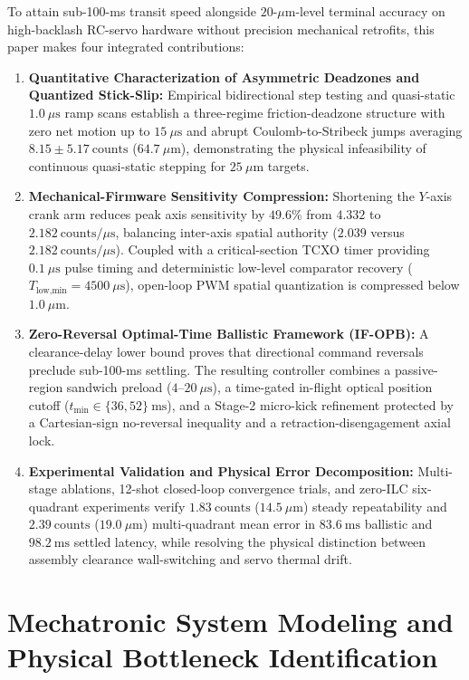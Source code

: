 \documentclass[journal]{IEEEtran}
\begin{document}
To attain sub-100-ms transit speed alongside $20$-$\mu\text{m}$-level terminal accuracy on high-backlash RC-servo hardware without precision mechanical retrofits, this paper makes four integrated contributions:
\begin{enumerate}
    \item \textbf{Quantitative Characterization of Asymmetric Deadzones and Quantized Stick-Slip:} Empirical bidirectional step testing and quasi-static $1.0\ \mu\text{s}$ ramp scans establish a three-regime friction-deadzone structure with zero net motion up to $15\ \mu\text{s}$ and abrupt Coulomb-to-Stribeck jumps averaging $8.15 \pm 5.17\ \text{counts}$ ($64.7\ \mu\text{m}$), demonstrating the physical infeasibility of continuous quasi-static stepping for $25\ \mu\text{m}$ targets.
    \item \textbf{Mechanical-Firmware Sensitivity Compression:} Shortening the $Y$-axis crank arm reduces peak axis sensitivity by $49.6\%$ from $4.332$ to $2.182\ \text{counts}/\mu\text{s}$, balancing inter-axis spatial authority ($2.039$ versus $2.182\ \text{counts}/\mu\text{s}$). Coupled with a critical-section TCXO timer providing $0.1\ \mu\text{s}$ pulse timing and deterministic low-level comparator recovery ($T_{\text{low,min}} = 4500\ \mu\text{s}$), open-loop PWM spatial quantization is compressed below $1.0\ \mu\text{m}$.
    \item \textbf{Zero-Reversal Optimal-Time Ballistic Framework (IF-OPB):} A clearance-delay lower bound proves that directional command reversals preclude sub-100-ms settling. The resulting controller combines a passive-region sandwich preload ($4\text{--}20\ \mu\text{s}$), a time-gated in-flight optical position cutoff ($t_{\min} \in \{36, 52\}\ \text{ms}$), and a Stage-2 micro-kick refinement protected by a Cartesian-sign no-reversal inequality and a retraction-disengagement axial lock.
    \item \textbf{Experimental Validation and Physical Error Decomposition:} Multi-stage ablations, 12-shot closed-loop convergence trials, and zero-ILC six-quadrant experiments verify $1.83\ \text{counts}$ ($14.5\ \mu\text{m}$) steady repeatability and $2.39\ \text{counts}$ ($19.0\ \mu\text{m}$) multi-quadrant mean error in $83.6\ \text{ms}$ ballistic and $98.2\ \text{ms}$ settled latency, while resolving the physical distinction between assembly clearance wall-switching and servo thermal drift.
\end{enumerate}

\section{Mechatronic System Modeling and Physical Bottleneck Identification}
\end{document}
